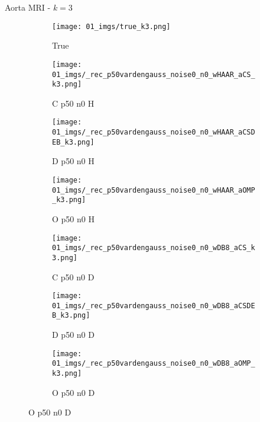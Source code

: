 \begin{frame}{Aorta MRI - $k=3$}{}
\begin{figure}
\begin{subfigure}{0.13\textwidth}
\texttt{[image: 01\_imgs/true\_k3.png]}
\caption*{\tiny True}
\end{subfigure}
\begin{subfigure}{0.13\textwidth}
\texttt{[image: 01\_imgs/\_rec\_p50vardengauss\_noise0\_n0\_wHAAR\_aCS\_k3.png]}
\caption*{\tiny C p50 n0 H}
\end{subfigure}
\begin{subfigure}{0.13\textwidth}
\texttt{[image: 01\_imgs/\_rec\_p50vardengauss\_noise0\_n0\_wHAAR\_aCSDEB\_k3.png]}
\caption*{\tiny D p50 n0 H}
\end{subfigure}
\begin{subfigure}{0.13\textwidth}
\texttt{[image: 01\_imgs/\_rec\_p50vardengauss\_noise0\_n0\_wHAAR\_aOMP\_k3.png]}
\caption*{\tiny O p50 n0 H}
\end{subfigure}
\begin{subfigure}{0.13\textwidth}
\texttt{[image: 01\_imgs/\_rec\_p50vardengauss\_noise0\_n0\_wDB8\_aCS\_k3.png]}
\caption*{\tiny C p50 n0 D}
\end{subfigure}
\begin{subfigure}{0.13\textwidth}
\texttt{[image: 01\_imgs/\_rec\_p50vardengauss\_noise0\_n0\_wDB8\_aCSDEB\_k3.png]}
\caption*{\tiny D p50 n0 D}
\end{subfigure}
\begin{subfigure}{0.13\textwidth}
\texttt{[image: 01\_imgs/\_rec\_p50vardengauss\_noise0\_n0\_wDB8\_aOMP\_k3.png]}
\caption*{\tiny O p50 n0 D}
\end{subfigure}

\vspace{5pt}


\end{figure}
\end{frame}
